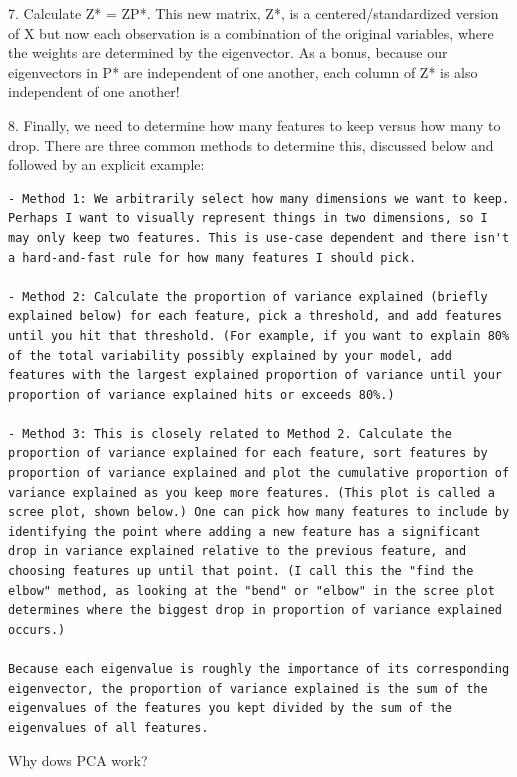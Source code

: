 \documentclass[
]{book}
\begin{document}
7. Calculate Z* = ZP*. This new matrix, Z*, is a centered/standardized version of X but now each observation is a combination of the original variables, where the weights are determined by the eigenvector. As a bonus, because our eigenvectors in P* are independent of one another, each column of Z* is also independent of one another!

8. Finally, we need to determine how many features to keep versus how many to drop. There are three common methods to determine this, discussed below and followed by an explicit example:

\begin{verbatim}
- Method 1: We arbitrarily select how many dimensions we want to keep. Perhaps I want to visually represent things in two dimensions, so I may only keep two features. This is use-case dependent and there isn't a hard-and-fast rule for how many features I should pick.

- Method 2: Calculate the proportion of variance explained (briefly explained below) for each feature, pick a threshold, and add features until you hit that threshold. (For example, if you want to explain 80% of the total variability possibly explained by your model, add features with the largest explained proportion of variance until your proportion of variance explained hits or exceeds 80%.)

- Method 3: This is closely related to Method 2. Calculate the proportion of variance explained for each feature, sort features by proportion of variance explained and plot the cumulative proportion of variance explained as you keep more features. (This plot is called a scree plot, shown below.) One can pick how many features to include by identifying the point where adding a new feature has a significant drop in variance explained relative to the previous feature, and choosing features up until that point. (I call this the "find the elbow" method, as looking at the "bend" or "elbow" in the scree plot determines where the biggest drop in proportion of variance explained occurs.)

Because each eigenvalue is roughly the importance of its corresponding eigenvector, the proportion of variance explained is the sum of the eigenvalues of the features you kept divided by the sum of the eigenvalues of all features.
\end{verbatim}

Why dows PCA work?
\end{document}
